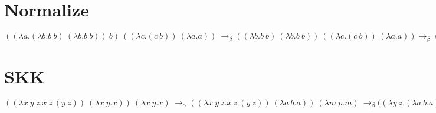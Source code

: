 \documentclass{article}
\begin{document}
\section{Normalize}
\begin{math}((\lambda a. (\lambda b.b \ b) \ (\lambda b.b \ b))\ b)\ ((\lambda c.(c\ b)) \ (\lambda a. a)) \ \rightarrow_{\beta} ((\lambda b.b \ b) \ (\lambda b.b \ b)) \ ((\lambda c.(c\ b)) \ (\lambda a. a)) \rightarrow_{\beta} ((\lambda b.b \ b) \ (\lambda b.b \ b)) ((\lambda a. a) \ b) \ \rightarrow_{\beta} ((\lambda b.b \ b) \ (\lambda b.b \ b)) \ b\end{math}
\section{SKK}
\begin{math}((\lambda x\ y\ z.x\ z\ (y\ z))\  (\lambda x\ y . x))\ (\lambda x\ y . x)\  \rightarrow_{\alpha} ((\lambda x\ y\ z.x\ z\ (y\ z))\  (\lambda a\ b . a))\ (\lambda m\ p . m)\  \rightarrow_{\beta} ((\lambda y\ z.(\lambda a \ b.a)\ z\ (y\ z))\ (\lambda m\ p . m)\ \rightarrow_{\beta} (\lambda z.(\lambda a \ b.a)\ z \ ((\lambda m\ p. m)\ z)) \ \rightarrow_{\beta} \lambda z.z\end{math}
\end{document}
